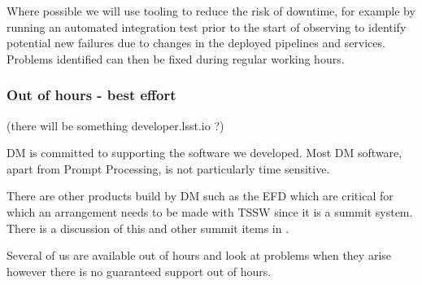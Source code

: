 Where possible we will use tooling to reduce the risk of downtime, for example by running an automated integration test prior to the start of observing to identify potential new failures due to changes in the deployed pipelines and services.
Problems identified can then be fixed during regular working hours.

\subsubsection{Out of hours - best effort}
(there will be something developer.lsst.io ?)


DM is committed to supporting the software we developed.
Most DM software, apart from Prompt Processing, is not particularly time sensitive.

There are other products build by DM such as the EFD which are critical for which an arrangement needs to be made with TSSW since it is a summit system. There is a discussion of this and other summit items in .


Several of us are available out of hours and look at problems when they arise however there is no guaranteed support out of hours.



